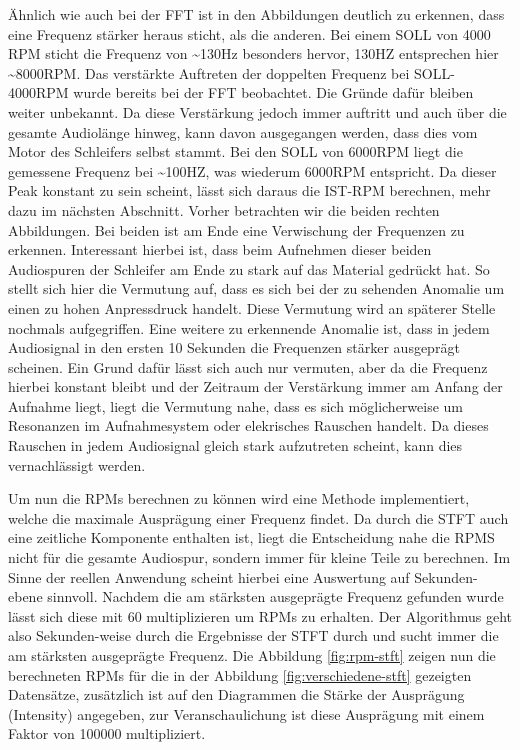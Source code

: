 Ähnlich wie auch bei der \ac{FFT} ist in den Abbildungen deutlich zu erkennen, dass eine Frequenz stärker heraus sticht, als die anderen. Bei einem SOLL von 4000 RPM sticht die Frequenz von \textasciitilde 130Hz besonders hervor, 130HZ entsprechen hier \textasciitilde 8000RPM. Das verstärkte Auftreten der doppelten Frequenz bei SOLL-4000RPM wurde bereits bei der \ac{FFT} beobachtet. Die Gründe dafür bleiben weiter unbekannt. Da diese Verstärkung jedoch immer auftritt und auch über die gesamte Audiolänge hinweg, kann davon ausgegangen werden, dass dies vom Motor des Schleifers selbst stammt. Bei den SOLL von 6000RPM liegt die gemessene Frequenz bei \textasciitilde 100HZ, was wiederum 6000RPM entspricht. Da dieser Peak konstant zu sein scheint, lässt sich daraus die IST-RPM berechnen, mehr dazu im nächsten Abschnitt. Vorher betrachten wir die beiden rechten Abbildungen. Bei beiden ist am Ende eine Verwischung der Frequenzen zu erkennen. Interessant hierbei ist, dass beim Aufnehmen dieser beiden Audiospuren der Schleifer am Ende zu stark auf das Material gedrückt hat. So stellt sich hier die Vermutung auf, dass es sich bei der zu sehenden Anomalie um einen zu hohen Anpressdruck handelt. Diese Vermutung wird an späterer Stelle nochmals aufgegriffen. Eine weitere zu erkennende Anomalie ist, dass in jedem Audiosignal in den ersten 10 Sekunden die Frequenzen stärker ausgeprägt scheinen. Ein Grund dafür lässt sich auch nur vermuten, aber da die Frequenz hierbei konstant bleibt und der Zeitraum der Verstärkung immer am Anfang der Aufnahme liegt, liegt die Vermutung nahe, dass es sich möglicherweise um Resonanzen im Aufnahmesystem oder elekrisches Rauschen handelt. Da dieses Rauschen in jedem Audiosignal gleich stark aufzutreten scheint, kann dies vernachlässigt werden.

Um nun die RPMs berechnen zu können wird eine Methode implementiert, welche die maximale Ausprägung einer Frequenz findet. Da durch die \ac{STFT} auch eine zeitliche Komponente enthalten ist, liegt die Entscheidung nahe die RPMS nicht für die gesamte Audiospur, sondern immer für kleine Teile zu berechnen. Im Sinne der reellen Anwendung scheint hierbei eine Auswertung auf Sekunden-ebene sinnvoll. Nachdem die am stärksten ausgeprägte Frequenz gefunden wurde lässt sich diese mit 60 multiplizieren um RPMs zu erhalten. Der Algorithmus geht also Sekunden-weise durch die Ergebnisse der \ac{STFT} durch und sucht immer die am stärksten ausgeprägte Frequenz. Die Abbildung \ref{fig:rpm-stft} zeigen nun die berechneten RPMs für die in der Abbildung \ref{fig:verschiedene-stft} gezeigten Datensätze, zusätzlich ist auf den Diagrammen die Stärke der Ausprägung (Intensity) angegeben, zur Veranschaulichung ist diese Ausprägung mit einem Faktor von 100000 multipliziert.

